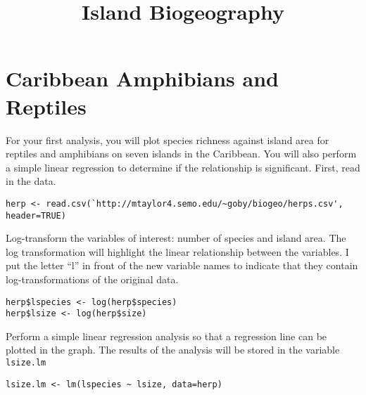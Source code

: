 \documentclass[11pt, oneside]{article}   	%
\title{Island Biogeography}
\author{}
\date{}							%
\begin{document}
\thispagestyle{firststyle}



\section{Caribbean Amphibians and Reptiles}

For your first analysis, you will plot species richness against island area for reptiles and amphibians on seven islands in the Caribbean. You will also perform a simple linear regression to determine if the relationship is significant. First, read in the data.

\begin{lstlisting}
herp <- read.csv(`http://mtaylor4.semo.edu/~goby/biogeo/herps.csv', header=TRUE)

\end{lstlisting}

Log-transform the variables of interest: number of species and island area. The log transformation will highlight the linear relationship between the variables. I put the letter ``l'' in front of the new variable names to indicate that they contain log-transformations of the original data.

\begin{lstlisting}
herp$lspecies <- log(herp$species)
herp$lsize <- log(herp$size)

\end{lstlisting}

Perform a simple linear regression analysis so that a regression line can be plotted in the graph. The results of the analysis will be stored in the variable \texttt{lsize.lm}

\begin{lstlisting}
lsize.lm <- lm(lspecies ~ lsize, data=herp)

\end{lstlisting}
\end{document}
